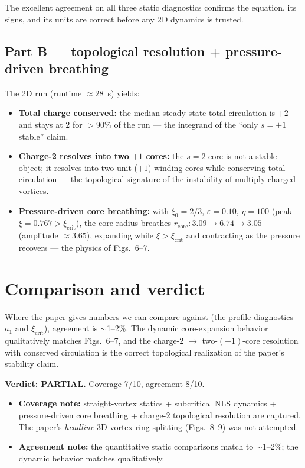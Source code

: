 \documentclass[11pt]{article}
\begin{document}
The excellent agreement on all three static diagnostics confirms the equation,
its signs, and its units are correct before any 2D dynamics is trusted.

\subsection{Part B --- topological resolution + pressure-driven breathing}
The 2D run (runtime $\approx28$~s) yields:
\begin{itemize}
  \item \textbf{Total charge conserved:} the median steady-state total
        circulation is $+2$ and stays at $2$ for $>90\%$ of the run --- the
        integrand of the ``only $s=\pm1$ stable'' claim.
  \item \textbf{Charge-2 resolves into two $+1$ cores:} the $s=2$ core is not a
        stable object; it resolves into two unit ($+1$) winding cores while
        conserving total circulation --- the topological signature of the
        instability of multiply-charged vortices.
  \item \textbf{Pressure-driven core breathing:} with $\xi_0=2/3$,
        $\varepsilon=0.10$, $\eta=100$ (peak $\xi=0.767>\xi_{\mathrm{crit}}$),
        the core radius breathes $r_{\mathrm{core}}:3.09\to6.74\to3.05$
        (amplitude $\approx3.65$), expanding while $\xi>\xi_{\mathrm{crit}}$ and
        contracting as the pressure recovers --- the physics of Figs.~6--7.
\end{itemize}

\section{Comparison and verdict}
Where the paper gives numbers we can compare against (the profile diagnostics
$a_1$ and $\xi_{\mathrm{crit}}$), agreement is $\sim$1--2\%. The dynamic
core-expansion behavior qualitatively matches Figs.~6--7, and the charge-2
$\to$ two-$(+1)$-core resolution with conserved circulation is the correct
topological realization of the paper's stability claim.

\medskip
\noindent\textbf{Verdict: PARTIAL.} Coverage 7/10, agreement 8/10.
\begin{itemize}
  \item \textbf{Coverage note:} straight-vortex statics + subcritical NLS
        dynamics + pressure-driven core breathing + charge-2 topological
        resolution are captured. The paper's \emph{headline} 3D vortex-ring
        splitting (Figs.~8--9) was not attempted.
  \item \textbf{Agreement note:} the quantitative static comparisons match to
        $\sim$1--2\%; the dynamic behavior matches qualitatively.
\end{itemize}
\end{document}
